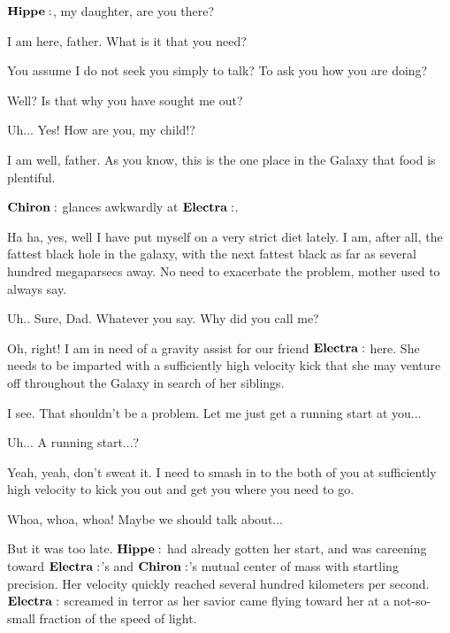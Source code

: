 \documentclass[main.tex]{subfiles}
\begin{document}
\Chiron $\Hippe$, my daughter, are you there?

\Hippe I am here, father.  What is it that you need?

\Chiron You assume I do not seek you simply to talk?  To ask you how you are doing?

\Hippe Well?  Is that why you have sought me out?

\Chiron Uh... Yes!  How are you, my child!?

\Hippe I am well, father.  As you know, this is the one place in the Galaxy that food is plentiful.  

$\Chiron$ glances awkwardly at $\Electra$.

\Chiron Ha ha, yes, well I have put myself on a very strict diet lately.  I am, after all, the fattest black hole in the galaxy, with the next fattest black as far as several hundred megaparsecs away.  No need to exacerbate the problem, mother used to always say.

\Hippe Uh.. Sure, Dad.  Whatever you say.  Why did you call me?

\Chiron Oh, right!  I am in need of a gravity assist for our friend $\Electra$ here.  She needs to be imparted with a sufficiently high velocity kick that she may venture off throughout the Galaxy in search of her siblings.

\Hippe I see.  That shouldn't be a problem.  Let me just get a running start at you...

\Electra Uh... A running start...?

\Hippe Yeah, yeah, don't sweat it.  I need to smash in to the both of you at sufficiently high velocity to kick you out and get you where you need to go.

\Electra Whoa, whoa, whoa!  Maybe we should talk about...

But it was too late.  $\Hippe$ had already gotten her start, and was careening toward $\Electra$'s and $\Chiron$'s mutual center of mass with startling precision.  Her velocity quickly reached several hundred kilometers per second.  $\Electra$ screamed in terror as her savior came flying toward her at a not-so-small fraction of the speed of light.
\end{document}
